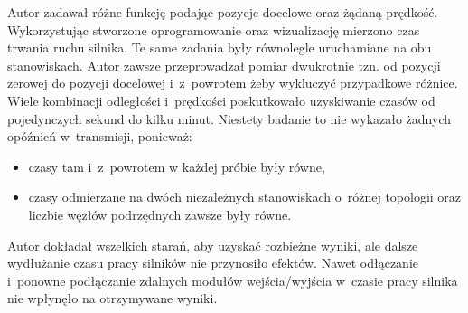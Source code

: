 Autor zadawał różne funkcję podając pozycje docelowe oraz żądaną prędkość. Wykorzystując stworzone oprogramowanie oraz wizualizację mierzono czas trwania ruchu silnika. Te same zadania były równolegle uruchamiane na obu stanowiskach. Autor zawsze przeprowadzał pomiar dwukrotnie tzn. od pozycji zerowej do pozycji docelowej i~z~powrotem żeby wykluczyć przypadkowe różnice. Wiele kombinacji odległości i~prędkości poskutkowało uzyskiwanie czasów od pojedynczych sekund do kilku minut. Niestety badanie to nie wykazało żadnych opóźnień w~transmisji, ponieważ:
\begin{itemize}
\item czasy tam i~z~powrotem w każdej próbie były równe,
\item czasy odmierzane na dwóch niezależnych stanowiskach o~różnej topologii oraz liczbie węzłów podrzędnych zawsze były równe.
\end{itemize}
Autor dokładał wszelkich starań, aby uzyskać rozbieżne wyniki, ale dalsze wydłużanie czasu pracy silników nie przynosiło efektów. Nawet odłączanie i~ponowne podłączanie zdalnych modułów wejścia/wyjścia w~czasie pracy silnika nie wpłynęło na otrzymywane wyniki.
%
%
%
%

